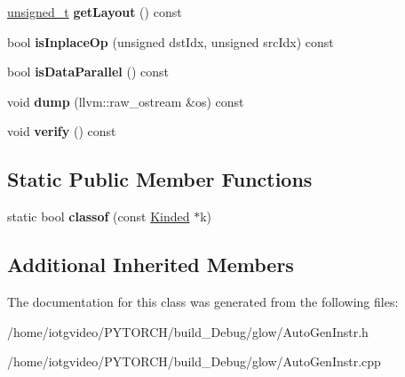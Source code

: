 \begin{DoxyCompactItemize}
\mbox{\label{classglow_1_1_max_pool_inst_a643447ea04b58d7f7a7067b871f30f58}} 
\hyperlink{namespaceglow_a0ca574644e1e42ef193a9947fb4d8911}{unsigned\+\_\+t} {\bfseries get\+Layout} () const
\item 
\mbox{\label{classglow_1_1_max_pool_inst_a025891d0f3312442544e7e490c4d3c19}} 
bool {\bfseries is\+Inplace\+Op} (unsigned dst\+Idx, unsigned src\+Idx) const
\item 
\mbox{\label{classglow_1_1_max_pool_inst_ac55d44325f4337a9d92c960ec30a9022}} 
bool {\bfseries is\+Data\+Parallel} () const
\item 
\mbox{\label{classglow_1_1_max_pool_inst_a00c805d3210cb7689255a2c844679a05}} 
void {\bfseries dump} (llvm\+::raw\+\_\+ostream \&os) const
\item 
\mbox{\label{classglow_1_1_max_pool_inst_a9799cb488995633985a639706ad23250}} 
void {\bfseries verify} () const
\end{DoxyCompactItemize}
\subsection*{Static Public Member Functions}
\begin{DoxyCompactItemize}
\item 
\mbox{\label{classglow_1_1_max_pool_inst_a38617a054783050bec39956756715f7d}} 
static bool {\bfseries classof} (const \hyperlink{classglow_1_1_kinded}{Kinded} $\ast$k)
\end{DoxyCompactItemize}
\subsection*{Additional Inherited Members}


The documentation for this class was generated from the following files\+:\begin{DoxyCompactItemize}
\item 
/home/iotgvideo/\+P\+Y\+T\+O\+R\+C\+H/build\+\_\+\+Debug/glow/Auto\+Gen\+Instr.\+h\item 
/home/iotgvideo/\+P\+Y\+T\+O\+R\+C\+H/build\+\_\+\+Debug/glow/Auto\+Gen\+Instr.\+cpp\end{DoxyCompactItemize}
